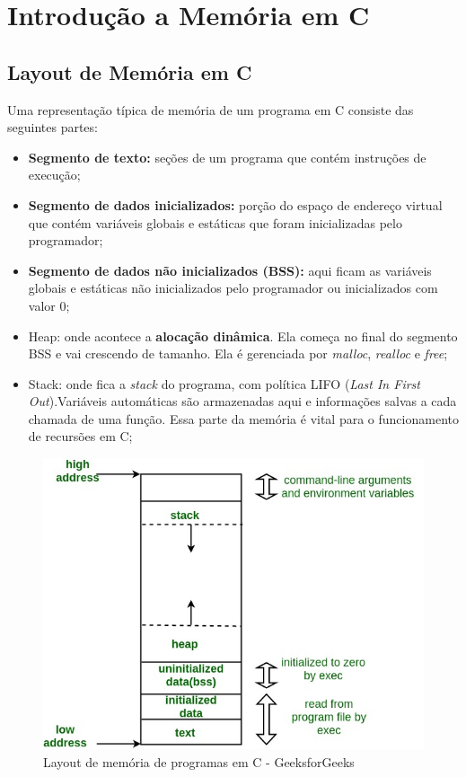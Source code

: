 \section{Introdução a Memória em C}

\subsection{Layout de Memória em C}

Uma representação típica de memória de um programa em C consiste das seguintes partes:
\begin{itemize}
  \item \textbf{Segmento de texto:} seções de um programa que contém instruções de execução;
  \item \textbf{Segmento de dados inicializados:} porção do espaço de endereço virtual que contém
    variáveis globais e estáticas que foram inicializadas pelo programador;
  \item \textbf{Segmento de dados não inicializados (BSS):} aqui ficam as variáveis globais e
    estáticas não inicializados pelo programador ou inicializados com valor 0;
  \item Heap: onde acontece a \textbf{alocação dinâmica}. Ela começa no final do segmento BSS e vai
    crescendo de tamanho. Ela é gerenciada por \textit{malloc}, \textit{realloc} e \textit{free};
  \item Stack: onde fica a \textit{stack} do programa, com política LIFO (\textit{Last In First
    Out}).Variáveis automáticas são armazenadas aqui e informações salvas a cada chamada de uma
    função. Essa parte da memória é vital para o funcionamento de recursões em C;
\end{itemize}

\begin{figure}[H]
  \includegraphics[scale=0.5]{assets/memory-layout-c.jpeg}
  \centering
  \caption{Layout de memória de programas em C - GeeksforGeeks}
\end{figure}


